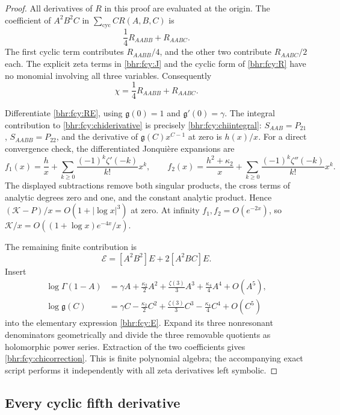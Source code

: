 \begin{proof}
All derivatives of \(R\) in this proof are evaluated at the
origin. The coefficient of \(A^2B^2C\) in
\(\sum_{\mathrm{cyc}}CR(A,B,C)\) is
\[
 \frac14R_{AABB}+R_{AABC}.
\]
The first cyclic term contributes \(R_{AABB}/4\), and the
other two contribute \(R_{AABC}/2\) each. The explicit
zeta terms in \eqref{bhr:fcy:J} and the cyclic form of
\eqref{bhr:fcy:R} have no monomial involving all three variables.
Consequently
\begin{equation}\label{bhr:fcy:chiderivative}
 \chi=\frac14R_{AABB}+R_{AABC}.
\end{equation}

Differentiate \eqref{bhr:fcy:RE}, using \(\mathfrak g(0)=1\) and
\(\mathfrak g'(0)=\gamma\). The integral contribution to
\eqref{bhr:fcy:chiderivative} is precisely \eqref{bhr:fcy:chiintegral}:
\(S_{AAB}=P_{21}\), \(S_{AABB}=P_{22}\), and the derivative
of \(\mathfrak g(C)x^{C-1}\) at zero is \(h(x)/x\).
For a direct convergence check, the differentiated Jonqui\`ere
expansions are
\[
 f_1(x)=\frac h x+\sum_{k\ge0}
       \frac{(-1)^k\zeta'(-k)}{k!}x^k,\qquad
 f_2(x)=\frac{h^2+\kappa_2}x+\sum_{k\ge0}
       \frac{(-1)^k\zeta''(-k)}{k!}x^k.
\]
The displayed subtractions remove both singular products, the
cross terms of analytic degrees zero and one, and the constant
analytic product. Hence \((\mathcal K-P)/x=O(1+|\log x|^3)\) at zero.
At infinity \(f_1,f_2=O(e^{-2x})\), so
\(\mathcal K/x=O((1+\log x)e^{-4x}/x)\).

The remaining finite contribution is
\[
 \mathcal E=[A^2B^2]E+2[A^2BC]E.
\]
Insert
\begin{align*}
 \log\Gamma(1-A)&=\gamma A+\frac{\kappa_2}{2} A^2
                  +\frac{\zeta(3)}3A^3+\frac{\kappa_4}4A^4+O(A^5),\\
 \log \mathfrak g(C)&=\gamma C-\frac{\kappa_2}{2} C^2
                  +\frac{\zeta(3)}3C^3-\frac{\kappa_4}4C^4+O(C^5)
\end{align*}
into the elementary expression \eqref{bhr:fcy:E}. Expand its three
nonresonant denominators geometrically and divide the three
removable quotients as holomorphic power series. Extraction of
the two coefficients gives \eqref{bhr:fcy:chicorrection}. This is
finite polynomial algebra; the accompanying exact script performs
it independently with all zeta derivatives left symbolic.
\end{proof}

\subsection{Every cyclic fifth derivative}

